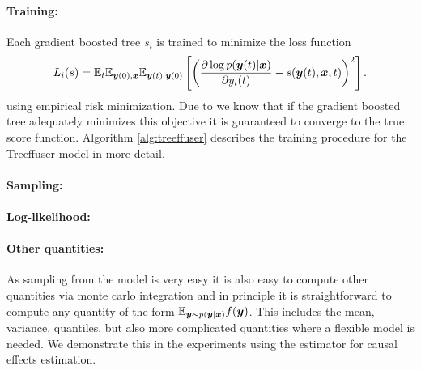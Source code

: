 \paragraph*{Training:}
Each  gradient boosted tree $s_i$ is trained to minimize the loss function
\begin{align}
    L_i(s) = \mathbb{E}_{t}\mathbb{E}_{\boldsymbol{y}(0), \boldsymbol{x}}\mathbb{E}_{\boldsymbol{y}(t)|\boldsymbol{y}(0)} \left[ \left(  \frac{\partial \log p(\boldsymbol{y}(t)| \boldsymbol{x})}{\partial y_i(t) } - s(\boldsymbol{y}(t), \boldsymbol{x}, t) \right)^2 \right].
\end{align}
using empirical risk minimization.
Due to \cite{Vincent2010} we know that if the gradient boosted tree adequately minimizes this objective it is guaranteed
to converge to the true score function.
Algorithm \ref{alg:treeffuser} describes the training procedure for the Treeffuser model in more detail.

\paragraph*{Sampling:} 

\paragraph*{Log-likelihood:}

\paragraph*{Other quantities:}
As sampling from the model is very easy it is also easy to compute other quantities via monte carlo integration and in principle
it is straightforward to compute any quantity of the form $\mathbb{E}_{\boldsymbol{y} \sim p(\boldsymbol{y}|\boldsymbol{x})} f(\boldsymbol{y})$. This includes the mean, variance, quantiles, but also more
complicated quantities where a flexible model is needed. We demonstrate this in the experiments using the estimator for causal effects estimation.
